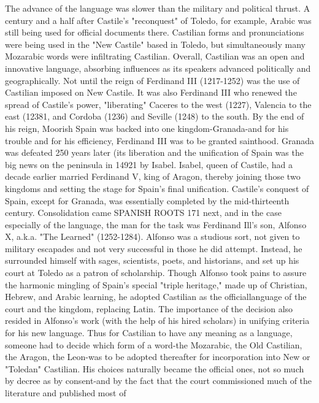 \documentclass[14pt,a4paper,oneside]{memoir}
\begin{document}
{{{{%
The advance of the language was slower than the military and
political thrust. A century and a half after Castile's "reconquest" of Toledo, for example, Arabic was still being used for official documents
there. Castilian forms and pronunciations were being used in the "New
Castile" based in Toledo, but simultaneously many Mozarabic words
were infiltrating Castilian. Overall, Castilian was an open and innovative language, absorbing influences as its speakers advanced politically
and geographically.
Not until the reign of Ferdinand III (1217-1252) was the use
of Castilian imposed on New Castile. It was also Ferdinand III who renewed the spread of Castile's power, "liberating" Caceres to the west
(1227), Valencia to the east (12381, and Cordoba (1236) and Seville
(1248) to the south. By the end of his reign, Moorish Spain was backed
into one kingdom-Granada-and for his trouble and for his efficiency,
Ferdinand III was to be granted sainthood. Granada was defeated 250
years later (its liberation and the unification of Spain was the big news
on the peninsula in 14921 by Isabel. Isabel, queen of Castile, had a decade earlier married Ferdinand V, king of Aragon, thereby joining those
two kingdoms and setting the stage for Spain's final unification.
Castile's conquest of Spain, except for Granada, was essentially completed by the mid-thirteenth century. Consolidation came
SPANISH ROOTS 171
next, and in the case especially of the language, the man for the task
was Ferdinand Ill's son, Alfonso X, a.k.a. "The Learned" (1252-1284).
Alfonso was a studious sort, not given to military escapades and not
very successful in those he did attempt. Instead, he surrounded himself
with sages, scientists, poets, and historians, and set up his court at Toledo as a patron of scholarship. Though Alfonso took pains to assure
the harmonic mingling of Spain's special "triple heritage," made up of
Christian, Hebrew, and Arabic learning, he adopted Castilian as the officiallanguage of the court and the kingdom, replacing Latin.
The importance of the decision also resided in Alfonso's work
(with the help of his hired scholars) in unifying criteria for his new language. Thus for Castilian to have any meaning as a language, someone
had to decide which form of a word-the Mozarabic, the Old Castilian,
the Aragon, the Leon-was to be adopted thereafter for incorporation
into New or "Toledan" Castilian. His choices naturally became the official ones, not so much by decree as by consent-and by the fact that
the court commissioned much of the literature and published most of
}}}}
\end{document}
